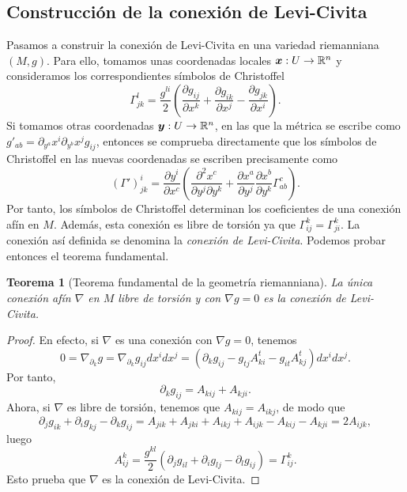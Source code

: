 \documentclass[11pt,a4paper]{amsbook}
\newtheorem{thm}[subsection]{Teorema}
\theoremstyle{remark} \newtheorem{rmk}[subsection]{Observación}
\theoremstyle{definition} \newtheorem{defn}[subsection]{Definición}
\theoremstyle{definition} \newtheorem{ex}[subsection]{Ejemplo}
\theoremstyle{definition} \newtheorem{ej}[subsection]{Ejercicio}
\begin{document}
\subsection{Construcción de la conexión de Levi-Civita} Pasamos a construir la conexión de Levi-Civita en una variedad riemanniana $(M,g)$. Para ello, tomamos unas coordenadas locales $\bm{x}:U\rightarrow \mathbb R^n$ y consideramos los correspondientes símbolos de Christoffel
\begin{equation*}
\Gamma^{l}_{jk} = \frac{g^{li}}{2} \left( \frac{\partial g_{ij}}{\partial x^k} + \frac{\partial g_{ik}}{\partial x^j} - \frac{\partial g_{jk}}{\partial x^i} \right).
\end{equation*}
Si tomamos otras coordenadas $\bm{y}:U\rightarrow \mathbb R^n$, en las que la métrica se escribe como $g'_{ab}=\partial_{y^a}x^i \partial_{y^b} x^j g_{ij}$, entonces se comprueba directamente que los símbolos de Christoffel en las nuevas coordenadas se escriben precisamente como
\begin{equation*}
(\Gamma')^i_{jk} = \frac{\partial y^i}{\partial x^c} \left( \frac{\partial^2 x^c}{\partial y^j \partial y^k} + \frac{\partial x^a}{\partial y^j} \frac{\partial x^b}{\partial y^k} \Gamma_{ab}^c \right).
\end{equation*}
Por tanto, los símbolos de Christoffel determinan los coeficientes de una conexión afín en $M$. Además, esta conexión es libre de torsión ya que $\Gamma_{ij}^k=\Gamma_{ji}^k$. La conexión así definida se denomina la \emph{conexión de Levi-Civita}. Podemos probar entonces el teorema fundamental.

\begin{thm}[Teorema fundamental de la geometría riemanniana]
La única conexión afín $\nabla$ en $M$ libre de torsión y con $\nabla g  = 0$ es la conexión de Levi-Civita.
\end{thm}

\begin{proof}
  En efecto, si $\nabla$ es una conexión con $\nabla g=0$, tenemos
  \begin{equation*}
0 = \nabla_{\partial_k} g = \nabla_{\partial_k} g_{ij} dx^idx^j = \left( \partial_k g_{ij} - g_{tj}A^t_{ki}- g_{it}A^t_{kj} \right) dx^i dx^j.
  \end{equation*}
  Por tanto,
  \begin{equation*}
\partial_k g_{ij} = A_{kij} + A_{kji}.
  \end{equation*}
  Ahora, si $\nabla$ es libre de torsión, tenemos que $A_{kij}=A_{ikj}$, de modo que
  \begin{equation*}
\partial_j g_{ik} + \partial_i g_{kj} - \partial_k g_{ij} = A_{jik} + A_{jki} + A_{ikj} + A_{ijk} - A_{kij} - A_{kji} = 2A_{ijk},
  \end{equation*}
  luego
  \begin{equation*}
A^k_{ij} = \frac{g^{kl}}{2} (\partial_j g_{il} + \partial_i g_{lj} - \partial_l g_{ij}) = \Gamma^k_{ij}.
  \end{equation*}
Esto prueba que $\nabla$ es la conexión de Levi-Civita.
\end{proof}
\end{document}
